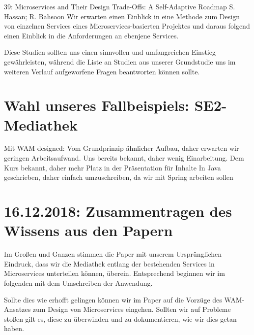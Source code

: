 \documentclass{article}
\begin{document}
39: Microservices and Their Design Trade-Offs: A Self-Adaptive Roadmap
  S. Hassan; R. Bahsoon
Wir erwarten einen Einblick in eine Methode zum Design von einzelnen Services eines Microservices-basierten Projektes und daraus folgend einen Einblick in die Anforderungen an ebenjene Services.

Diese Studien sollten uns einen sinnvollen und umfangreichen Einstieg gewährleisten, während die Liste an Studien aus unserer Grundstudie uns im weiteren Verlauf aufgeworfene Fragen beantworten können sollte.

\section{Wahl unseres Fallbeispiels: SE2-Mediathek}

Mit WAM designed: Vom Grundprinzip ähnlicher Aufbau, daher erwarten wir geringen Arbeitsaufwand.
Uns bereits bekannt, daher wenig Einarbeitung.
Dem Kurs bekannt, daher mehr Platz in der Präsentation für Inhalte
In Java geschrieben, daher einfach umzuschreiben, da wir mit Spring arbeiten sollen


\section{16.12.2018: Zusammentragen des Wissens aus den Papern}

Im Großen und Ganzen stimmen die Paper mit unserem Ursprünglichen Eindruck, dass wir die Mediathek entlang der bestehenden Services in Microservices unterteilen können, überein.
Entsprechend beginnen wir im folgenden mit dem Umschreiben der Anwendung.

Sollte dies wie erhofft gelingen können wir im Paper auf die Vorzüge des WAM-Ansatzes zum Design von Microservices eingehen. Sollten wir auf Probleme stoßen gilt es, diese zu überwinden und zu dokumentieren, wie wir dies getan haben.
\end{document}

